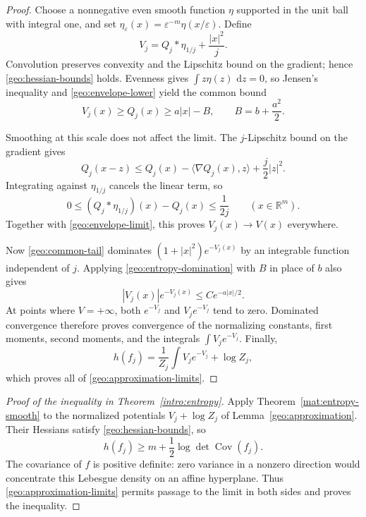 \documentclass[11pt]{article}
\theoremstyle{definition}
\theoremstyle{remark}
\numberwithin{equation}{section}
\begin{document}
\begin{proof}
Choose a nonnegative even smooth function $\eta$ supported in the unit ball
with integral one, and set $\eta_\varepsilon(x)=\varepsilon^{-m}
\eta(x/\varepsilon)$.  Define
\begin{equation}\label{geo:smooth-potentials}
  V_j=Q_j*\eta_{1/j}+\frac{|x|^2}j.
\end{equation}
Convolution preserves convexity and the Lipschitz bound on the gradient;
hence \eqref{geo:hessian-bounds} holds.  Evenness gives
$\int z\eta(z)\,\,\mathrm d z=0$, so Jensen's inequality and
\eqref{geo:envelope-lower} yield the common bound
\begin{equation}\label{geo:common-tail}
  V_j(x)\geq Q_j(x)\geq a|x|-B,
  \qquad B=b+\frac{a^2}2.
\end{equation}

Smoothing at this scale does not affect the limit.  The $j$-Lipschitz
bound on the gradient gives
\[
  Q_j(x-z)\leq Q_j(x)-\langle\nabla Q_j(x),z\rangle+\frac j2|z|^2.
\]
Integrating against $\eta_{1/j}$ cancels the linear term, so
\[
  0\leq (Q_j*\eta_{1/j})(x)-Q_j(x)\leq\frac1{2j}
  \qquad(x\in\mathbb R^m).
\]
Together with \eqref{geo:envelope-limit}, this proves
$V_j(x)\to V(x)$ everywhere.

Now \eqref{geo:common-tail} dominates $(1+|x|^2)e^{-V_j(x)}$ by an
integrable function independent of $j$.  Applying
\eqref{geo:entropy-domination} with $B$ in place of $b$ also gives
\[
  |V_j(x)|e^{-V_j(x)}\leq C e^{-a|x|/2}.
\]
At points where $V=+\infty$, both $e^{-V_j}$ and $V_je^{-V_j}$ tend to
zero.  Dominated convergence therefore proves convergence of the
normalizing constants, first moments, second moments, and the integrals
$\int V_je^{-V_j}$.  Finally,
\[
  h(f_j)=\frac1{Z_j}\int V_je^{-V_j}+\log Z_j,
\]
which proves all of \eqref{geo:approximation-limits}.
\end{proof}

\begin{proof}[Proof of the inequality in Theorem~\ref{intro:entropy}]
Apply Theorem~\ref{mat:entropy-smooth} to the normalized potentials
$V_j+\log Z_j$ of Lemma~\ref{geo:approximation}.  Their Hessians satisfy
\eqref{geo:hessian-bounds}, so
\[
  h(f_j)\geq m+\frac12\log\det\operatorname{Cov}(f_j).
\]
The covariance of $f$ is positive definite: zero variance in a nonzero
direction would concentrate this Lebesgue density on an affine hyperplane.
Thus \eqref{geo:approximation-limits} permits passage to the limit in both
sides and proves the inequality.
\end{proof}
\end{document}
